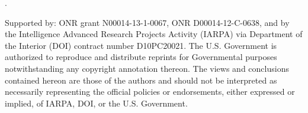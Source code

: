 \documentclass[11pt,twoside]{article}
\newif\myifpdf
\newcounter{lastnote}
\newenvironment{scilastnote}{%
\setcounter{lastnote}{\value{enumiv}}%
\addtocounter{lastnote}{+1}%
\begin{list}%
{\arabic{lastnote}.}
{\setlength{\leftmargin}{.22in}}
{\setlength{\labelsep}{.5em}}}
{\end{list}}
\begin{document}
\begin{scilastnote}
\item Supported by: ONR grant N00014-13-1-0067, ONR D00014-12-C-0638, and by the Intelligence Advanced Research Projects Activity (IARPA) via Department of the Interior (DOI) contract number D10PC20021. The U.S. Government is authorized to reproduce and distribute reprints for Governmental purposes notwithstanding any copyright annotation thereon. The views and conclusions contained hereon are those of the authors and should not be interpreted as necessarily representing the official policies or endorsements, either expressed or implied, of IARPA, DOI, or the U.S. Government.
\end{scilastnote}
\end{document}
